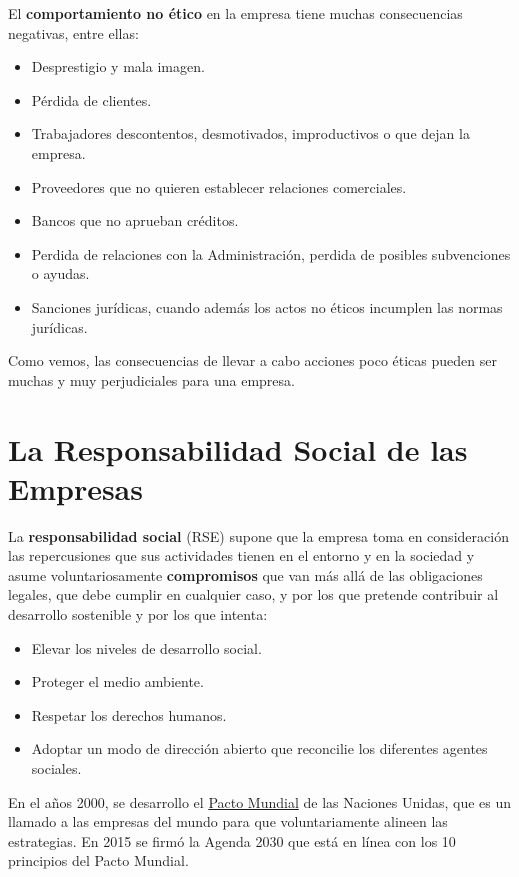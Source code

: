 El \textbf{comportamiento no ético} en la empresa tiene muchas consecuencias negativas, entre ellas:

\begin{itemize}
    \item Desprestigio y mala imagen.
    \item Pérdida de clientes.
    \item Trabajadores descontentos, desmotivados, improductivos o que dejan la empresa.
    \item Proveedores que no quieren establecer relaciones comerciales.
    \item Bancos que no aprueban créditos.
    \item Perdida de relaciones con la Administración, perdida de posibles subvenciones o ayudas.
    \item Sanciones jurídicas, cuando además los actos no éticos incumplen las normas jurídicas.
\end{itemize}

Como vemos, las consecuencias de llevar a cabo acciones poco éticas pueden ser muchas y muy perjudiciales para una empresa.

\section{La Responsabilidad Social de las Empresas}
La \textbf{responsabilidad social} (RSE) supone que la empresa toma en consideración las repercusiones que sus actividades tienen en el entorno y en la sociedad y asume voluntariosamente \textbf{compromisos} que van más allá de las obligaciones legales, que debe cumplir en cualquier caso, y por los que pretende contribuir al desarrollo sostenible y por los que intenta:

\begin{itemize}
    \item Elevar los niveles de desarrollo social.
    \item Proteger el medio ambiente.
    \item Respetar los derechos humanos.
    \item Adoptar un modo de dirección abierto que reconcilie los diferentes agentes sociales.
\end{itemize}

En el años 2000, se desarrollo el \href{https://www.pactomundial.org/noticia/10-principios-17-ods/}{Pacto Mundial} de las Naciones Unidas, que es un llamado a las empresas del mundo para que voluntariamente alineen las estrategias. En 2015 se firmó la Agenda 2030 que está en línea con los 10 principios del Pacto Mundial.

